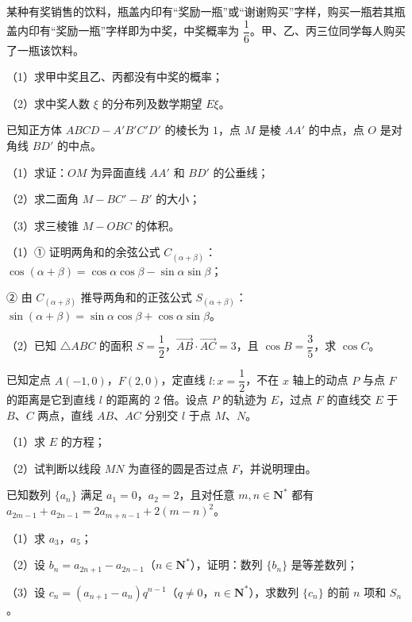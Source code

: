 \begin{question}
某种有奖销售的饮料，瓶盖内印有“奖励一瓶”或“谢谢购买”字样，购买一瓶若其瓶盖内印有“奖励一瓶”字样即为中奖，中奖概率为 $\dfrac{1}{6}$。甲、乙、丙三位同学每人购买了一瓶该饮料。

（1）求甲中奖且乙、丙都没有中奖的概率；

（2）求中奖人数 $\xi$ 的分布列及数学期望 $E\xi$。

\Needspace{0.4\textheight}
\end{question}
\begingroup
\renewenvironment{question}{\Needspace{0.5\textheight}}{}
\begin{question}
已知正方体 $ABCD-A'B'C'D'$ 的棱长为 $1$，点 $M$ 是棱 $AA'$ 的中点，点 $O$ 是对角线 $BD'$ 的中点。

（1）求证：$OM$ 为异面直线 $AA'$ 和 $BD'$ 的公垂线；

（2）求二面角 $M-BC'-B'$ 的大小；

（3）求三棱锥 $M-OBC$ 的体积。
\nopagebreak[4]
\begin{center}\end{center}
\nopagebreak[4]
\end{question}
\endgroup
\begin{question}
（1）① 证明两角和的余弦公式 $C_{(\alpha+\beta)}$：$\cos(\alpha+\beta)=\cos\alpha\cos\beta-\sin\alpha\sin\beta$；

② 由 $C_{(\alpha+\beta)}$ 推导两角和的正弦公式 $S_{(\alpha+\beta)}$：$\sin(\alpha+\beta)=\sin\alpha\cos\beta+\cos\alpha\sin\beta$。

（2）已知 $\triangle ABC$ 的面积 $S=\dfrac{1}{2}$，$\overrightarrow{AB}\cdot\overrightarrow{AC}=3$，且 $\cos B=\dfrac{3}{5}$，求 $\cos C$。

\end{question}
\begin{question}
已知定点 $A(-1,0)$，$F(2,0)$，定直线 $l:x=\dfrac{1}{2}$，不在 $x$ 轴上的动点 $P$ 与点 $F$ 的距离是它到直线 $l$ 的距离的 $2$ 倍。设点 $P$ 的轨迹为 $E$，过点 $F$ 的直线交 $E$ 于 $B$、$C$ 两点，直线 $AB$、$AC$ 分别交 $l$ 于点 $M$、$N$。

（1）求 $E$ 的方程；

（2）试判断以线段 $MN$ 为直径的圆是否过点 $F$，并说明理由。

\end{question}
\begin{question}
已知数列 $\{a_n\}$ 满足 $a_1=0$，$a_2=2$，且对任意 $m,n\in\mathbf N^*$ 都有 $a_{2m-1}+a_{2n-1}=2a_{m+n-1}+2(m-n)^2$。

（1）求 $a_3$，$a_5$；

（2）设 $b_n=a_{2n+1}-a_{2n-1}$（$n\in\mathbf N^*$），证明：数列 $\{b_n\}$ 是等差数列；

（3）设 $c_n=(a_{n+1}-a_n)q^{n-1}$（$q\neq0$，$n\in\mathbf N^*$），求数列 $\{c_n\}$ 的前 $n$ 项和 $S_n$。

\end{question}
